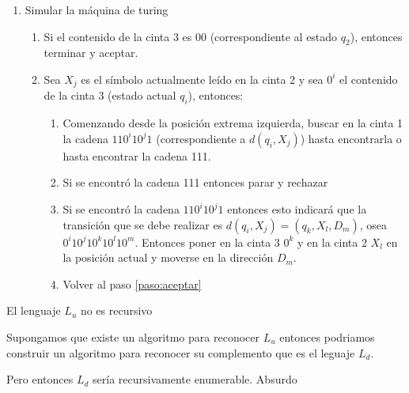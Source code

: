 \begin{demoPart}[0.8\textwidth]
  \begin{enumerate}[3.]
    \item Simular la máquina de turing
          \begin{enumerate}
            \item Si el contenido de la cinta 3 es 00 (correspondiente al estado \(q_2\)), entonces terminar y aceptar.\label{paso:aceptar}
            \item Sea \(X_j\) es el símbolo actualmente leído en la cinta 2 y sea \(0^i\) el contenido de la cinta 3 (estado actual \(q_i\)), entonces:
                  \begin{enumerate}
                    \item Comenzando desde la posición extrema izquierda, buscar en la cinta 1 la cadena \(110^i10^j1\) (correspondiente a \(d(q_i, X_j)\)) hasta encontrarla o hasta encontrar la cadena 111.
                    \item Si se encontró la cadena 111 entonces parar y rechazar
                    \item Si se encontró la cadena \(110^i10^j1\) entonces esto indicará que la transición que se debe realizar es \(d(q_i, X_j) = (q_k, X_l, D_m)\), osea \(0^i10^j10^k10^l10^m\). Entonces poner en la cinta 3 \(0^k\) y en la cinta 2 \(X_l\) en la posición actual y moverse en la dirección \(D_m\).
                    \item Volver al paso \ref{paso:aceptar}
                  \end{enumerate}
          \end{enumerate}
  \end{enumerate}
\end{demoPart}

\begin{teorema}
  El lenguaje \(L_u\) no es recursivo
\end{teorema}

\begin{demo}[0.8\textwidth]
  Supongamos que existe un algoritmo para reconocer \(L_u\) entonces podriamos construir un algoritmo para reconocer su complemento que es el leguaje \(L_d\).

  Pero entonces \(L_d\) sería recursivamente enumerable. Absurdo
\end{demo}